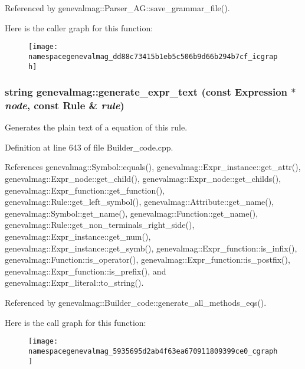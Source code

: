 Referenced by genevalmag::Parser\_\-AG::save\_\-grammar\_\-file().

Here is the caller graph for this function:\nopagebreak
\begin{figure}[H]
\begin{center}
\leavevmode
\texttt{[image: namespacegenevalmag\_dd88c73415b1eb5c506b9d66b294b7cf\_icgraph]}
\end{center}
\end{figure}
\hypertarget{namespacegenevalmag_5935695d2ab4f63ea670911809399ce0}{
\subsubsection[{generate\_\-expr\_\-text}]{\setlength{\rightskip}{0pt plus 5cm}string genevalmag::generate\_\-expr\_\-text (const {\bf Expression} $\ast$ {\em node}, \/  const {\bf Rule} \& {\em rule})}}
\label{namespacegenevalmag_5935695d2ab4f63ea670911809399ce0}


Generates the plain text of a equation of this rule. 

Definition at line 643 of file Builder\_\-code.cpp.

References genevalmag::Symbol::equals(), genevalmag::Expr\_\-instance::get\_\-attr(), genevalmag::Expr\_\-node::get\_\-child(), genevalmag::Expr\_\-node::get\_\-childs(), genevalmag::Expr\_\-function::get\_\-function(), genevalmag::Rule::get\_\-left\_\-symbol(), genevalmag::Attribute::get\_\-name(), genevalmag::Symbol::get\_\-name(), genevalmag::Function::get\_\-name(), genevalmag::Rule::get\_\-non\_\-terminals\_\-right\_\-side(), genevalmag::Expr\_\-instance::get\_\-num(), genevalmag::Expr\_\-instance::get\_\-symb(), genevalmag::Expr\_\-function::is\_\-infix(), genevalmag::Function::is\_\-operator(), genevalmag::Expr\_\-function::is\_\-postfix(), genevalmag::Expr\_\-function::is\_\-prefix(), and genevalmag::Expr\_\-literal::to\_\-string().

Referenced by genevalmag::Builder\_\-code::generate\_\-all\_\-methods\_\-eqs().

Here is the call graph for this function:\nopagebreak
\begin{figure}[H]
\begin{center}
\leavevmode
\texttt{[image: namespacegenevalmag\_5935695d2ab4f63ea670911809399ce0\_cgraph]}
\end{center}
\end{figure}



